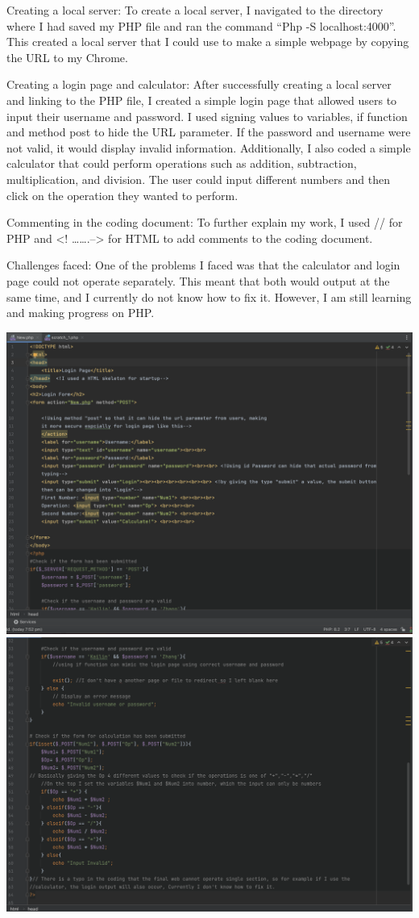\documentclass[a4paper, 11pt]{report}
\begin{document}
Creating a local server:
To create a local server, I navigated to the directory where I had saved my PHP file and ran the command “Php -S localhost:4000”. This created a local server that I could use to make a simple webpage by copying the URL to my Chrome.

Creating a login page and calculator:
After successfully creating a local server and linking to the PHP file, I created a simple login page that allowed users to input their username and password. I used signing values to variables, if function and method post to hide the URL parameter. If the password and username were not valid, it would display invalid information. Additionally, I also coded a simple calculator that could perform operations such as addition, subtraction, multiplication, and division. The user could input different numbers and then click on the operation they wanted to perform.

Commenting in the coding document:
To further explain my work, I used // for PHP and <! …….--> for HTML to add comments to the coding document.

Challenges faced:
One of the problems I faced was that the calculator and login page could not operate separately. This meant that both would output at the same time, and I currently do not know how to fix it. However, I am still learning and making progress on PHP.

\includegraphics[width=1\textwidth]{1}
\includegraphics[width=1\textwidth]{2}

\newpage


\end{document}
